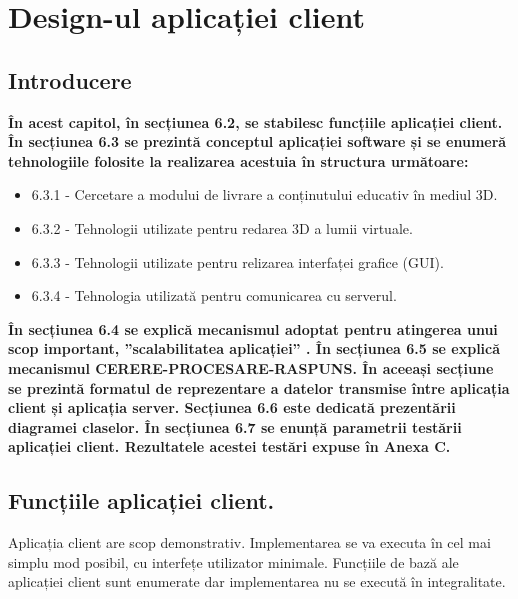 \chapter{Design-ul aplicației client}
\section{Introducere}
\par \textbf{În acest capitol, în secțiunea 6.2, se stabilesc funcțiile aplicației client. În secțiunea 6.3 se prezintă conceptul aplicației software și se enumeră tehnologiile folosite la realizarea acestuia în structura următoare: }

\begin{itemize}
\item 6.3.1 - Cercetare a modului de livrare a conținutului educativ în mediul 3D.
\item 6.3.2 - Tehnologii utilizate pentru redarea 3D a lumii virtuale.
\item 6.3.3 - Tehnologii utilizate pentru relizarea interfaței grafice (GUI).
\item 6.3.4 - Tehnologia utilizată pentru comunicarea cu serverul.
\end{itemize}

\par \textbf{ În secțiunea 6.4 se explică mecanismul adoptat pentru atingerea unui scop important, ”scalabilitatea aplicației” . În secțiunea 6.5 se explică mecanismul CERERE-PROCESARE-RASPUNS. În aceeași secțiune se prezintă formatul de reprezentare a datelor transmise între aplicația client și aplicația server. Secțiunea 6.6 este dedicată prezentării diagramei claselor. În secțiunea 6.7 se enunță parametrii testării aplicației client. Rezultatele acestei testări expuse în Anexa C. } 

\newpage

\section{Funcțiile aplicației client.}

\par Aplicația client are scop demonstrativ. Implementarea se va executa în cel mai simplu mod posibil, cu interfețe utilizator minimale. Funcțiile de bază ale aplicației client sunt enumerate dar implementarea nu se execută în integralitate.

